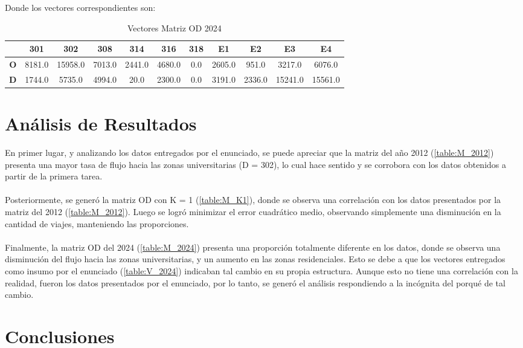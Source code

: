 \documentclass[12pt]{article} %
\begin{document}
Donde los vectores correspondientes son:

\begin{table}[H]
  \centering
  \footnotesize
  \begin{tabular}{c|cccccccccc}    
  \textbf{} & \textbf{301} & \textbf{302} & \textbf{308} & \textbf{314} & \textbf{316} & \textbf{318} & \textbf{E1} & \textbf{E2} & \textbf{E3} & \textbf{E4} \\ \hline
  \textbf{O} & 8181.0 & 15958.0 & 7013.0 & 2441.0 & 4680.0 & 0.0 & 2605.0 & 951.0 & 3217.0 & 6076.0 \\ 
  \textbf{D} & 1744.0 & 5735.0 & 4994.0 & 20.0 & 2300.0 & 0.0 & 3191.0 & 2336.0 & 15241.0 & 15561.0 \\ 
  \end{tabular}
  \caption{Vectores Matriz OD 2024}
  \label{table:data_matrix}
\end{table}

\newpage
\section{Análisis de Resultados}

En primer lugar, y analizando los datos entregados por el enunciado, se puede apreciar que la matriz del año 2012 (\ref{table:M_2012}) presenta una mayor tasa de flujo hacia las zonas universitarias (D = 302), lo cual hace sentido y se corrobora con los datos obtenidos a partir de la primera tarea.
\\ \\
Posteriormente, se generó la matriz OD con K = 1 (\ref{table:M_K1}), donde se observa una correlación con los datos presentados por la matriz del 2012 (\ref{table:M_2012}). Luego se logró minimizar el error cuadrático medio, observando simplemente una disminución en la cantidad de viajes, manteniendo las proporciones.
\\ \\
Finalmente, la matriz OD del 2024 (\ref{table:M_2024}) presenta una proporción totalmente diferente en los datos, donde se observa una disminución del flujo hacia las zonas universitarias, y un aumento en las zonas residenciales. Esto se debe a que los vectores entregados como insumo por el enunciado (\ref{table:V_2024}) indicaban tal cambio en su propia estructura. Aunque esto no tiene una correlación con la realidad, fueron los datos presentados por el enunciado, por lo tanto, se generó el análisis respondiendo a la incógnita del porqué de tal cambio.

\section{Conclusiones}
\end{document}

